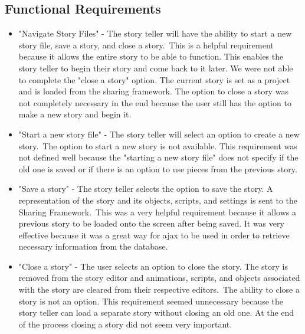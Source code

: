 \documentclass[12pt]{article}
\begin{document}
\subsection{Functional Requirements}
\begin{itemize}
\item "Navigate Story Files" - The story teller will have the ability to start a new story file, save a story, and close a story.\ 
This is a helpful requirement because it allows the entire story to be able to function.  This enables the story teller to begin their story and come back to it later.  We were not able to complete the "close a story" option.  The current story is set as a project and is loaded from the sharing framework.  The option to close a story was not completely necessary in the end because the user still has the option to make a new story and begin it.

\item "Start a new story file" - The story teller will select an option to create a new story.\
The option to start a new story is not available.  This requirement was not defined well because the "starting a new story file" does not specify if the old one is saved or if there is an option to use pieces from the previous story.

\item "Save a story" - The story teller selects the option to save the story.  A representation of the story and its objects, scripts, and settings is sent to the Sharing Framework.\
This was a very helpful requirement because it allows a previous story to be loaded onto the screen after being saved.  It was very effective because it was a great way for ajax to be used in order to retrieve necessary information from the database.

\item "Close a story" -  The user selects an option to close the story.  The story is removed from the story editor and animations, scripts, and objects associated with the story are cleared from their respective editors.\
The ability to close a story is not an option.  This requirement seemed unnecessary because the story teller can load a separate story without closing an old one.  At the end of the process closing a story did not seem very important.


\end{itemize}
\end{document}
